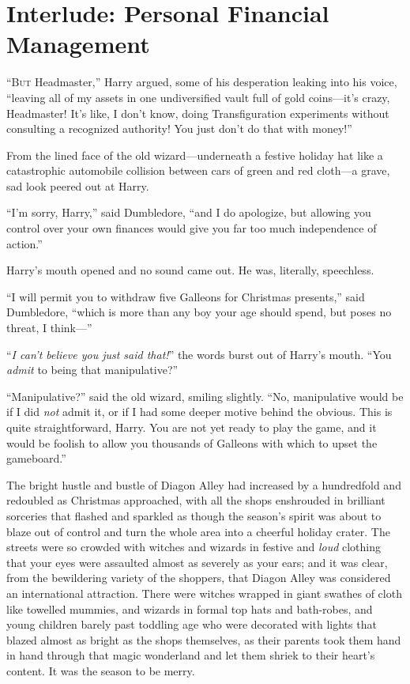 \chapter{Interlude: Personal Financial Management}

\lettrine{“B}{ut} Headmaster,”
Harry argued, some of his desperation leaking into his voice, “leaving all of my assets in one undiversified vault full of gold coins—it’s crazy, Headmaster! It’s like, I don’t know, doing Transfiguration experiments without consulting a recognized authority! You just don’t do that with money!”

From the lined face of the old wizard—underneath a festive holiday hat like a catastrophic automobile collision between cars of green and red cloth—a grave, sad look peered out at Harry.

“I’m sorry, Harry,” said Dumbledore, “and I do apologize, but allowing you control over your own finances would give you far too much independence of action.”

Harry’s mouth opened and no sound came out. He was, literally, speechless.

“I will permit you to withdraw five Galleons for Christmas presents,” said Dumbledore, “which is more than any boy your age should spend, but poses no threat, I think—”

“\emph{I can’t believe you just said that!}” the words burst out of Harry’s mouth. “You \emph{admit} to being that manipulative?”

“Manipulative?” said the old wizard, smiling slightly. “No, manipulative would be if I did \emph{not} admit it, or if I had some deeper motive behind the obvious. This is quite straightforward, Harry. You are not yet ready to play the game, and it would be foolish to allow you thousands of Galleons with which to upset the gameboard.”

\later

The bright hustle and bustle of Diagon Alley had increased by a hundredfold and redoubled as Christmas approached, with all the shops enshrouded in brilliant sorceries that flashed and sparkled as though the season’s spirit was about to blaze out of control and turn the whole area into a cheerful holiday crater. The streets were so crowded with witches and wizards in festive and \emph{loud} clothing that your eyes were assaulted almost as severely as your ears; and it was clear, from the bewildering variety of the shoppers, that Diagon Alley was considered an international attraction. There were witches wrapped in giant swathes of cloth like towelled mummies, and wizards in formal top hats and bath-robes, and young children barely past toddling age who were decorated with lights that blazed almost as bright as the shops themselves, as their parents took them hand in hand through that magic wonderland and let them shriek to their heart’s content. It was the season to be merry.

